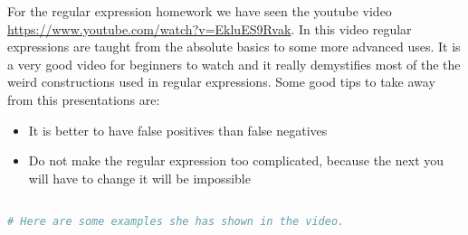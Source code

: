 For the regular expression homework we have seen the youtube video \url{https://www.youtube.com/watch?v=EkluES9Rvak}. In this video regular expressions are taught from the absolute basics to some more advanced uses. It is a very good video for beginners to watch and it really demystifies most of the the weird constructions used in regular expressions. Some good tips to take away from this presentations are:
\begin{itemize}
\item It is better to have false positives than false negatives
\item Do not make the regular expression too complicated, because the next you will have to change it will be impossible
\end{itemize}
\begin{lstlisting}[language=bash,label=lst:exampleregex,caption=Regex examples]

# Here are some examples she has shown in the video.

\end{lstlisting}